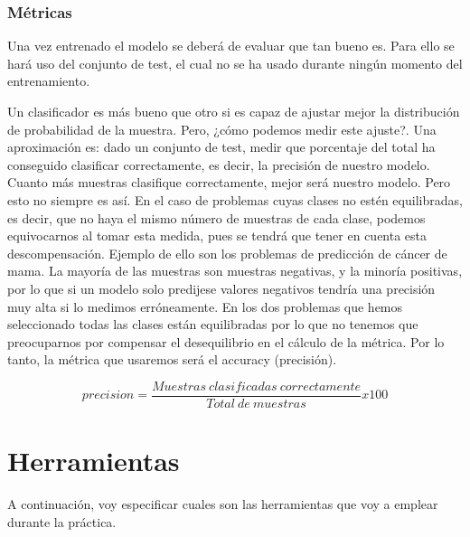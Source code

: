 \subsubsection{Métricas}

Una vez entrenado el modelo se deberá de evaluar que tan bueno es. Para ello se hará uso del conjunto de test, el cual no se ha usado durante ningún momento del entrenamiento. 

Un clasificador es más bueno que otro si es capaz de ajustar mejor la distribución de probabilidad de la muestra. Pero, ¿cómo podemos medir este ajuste?. Una aproximación es: dado un conjunto de test, medir que porcentaje del total ha conseguido clasificar correctamente, es decir, la precisión de nuestro modelo. Cuanto más muestras clasifique correctamente, mejor será nuestro modelo. Pero esto no siempre es así. En el caso de problemas cuyas clases no estén equilibradas, es decir, que no haya el mismo número de muestras de cada clase, podemos equivocarnos al tomar esta medida, pues se tendrá que tener en cuenta esta descompensación. Ejemplo de ello son los problemas de predicción de cáncer de mama. La mayoría de las muestras son muestras negativas, y la minoría positivas, por lo que si un modelo solo predijese valores negativos tendría una precisión muy alta si lo medimos erróneamente. En los dos problemas que hemos seleccionado todas las clases están equilibradas por lo que no tenemos que preocuparnos por compensar el desequilibrio en el cálculo de la métrica. Por lo tanto, la métrica que usaremos será el accuracy (precisión).

\begin{equation}
    precision = \frac{Muestras\ clasificadas\ correctamente}{Total\ de\ muestras}x100
\end{equation}

\section{Herramientas}

A continuación, voy especificar cuales son las herramientas que voy a emplear durante la práctica.  

